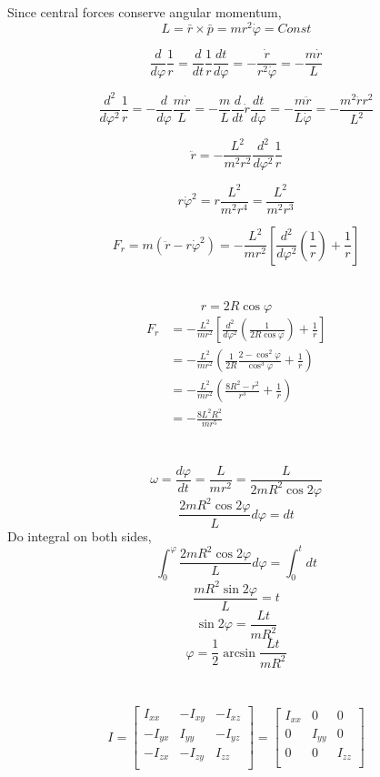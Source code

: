 \documentclass{article}
\begin{document}
\section{}
Since central forces conserve angular momentum,
$$L=\bar{r}\times\bar{p}=mr^2\dot{\varphi}=Const$$

$$\frac{d}{d\varphi}\frac{1}{r}=\frac{d}{dt}\frac{1}{r}\frac{dt}{d\varphi}=-\frac{\dot{r}}{r^2\dot{\varphi}}=-\frac{m\dot{r}}{L}$$

$$\frac{d^2}{d\varphi^2}\frac{1}{r}=-\frac{d}{d\varphi}\frac{m\dot{r}}{L}=-\frac{m}{L}\frac{d}{dt}\dot{r}\frac{dt}{d\varphi}=-\frac{m\ddot{r}}{L\dot{\varphi}}=-\frac{m^2\ddot{r}r^2}{L^2}$$

$$\ddot{r}=-\frac{L^2}{m^2r^2}\frac{d^2}{d\varphi^2}\frac{1}{r}$$

$$r\dot{\varphi}^2=r\frac{L^2}{m^2r^4}=\frac{L^2}{m^2r^3}$$

$$F_r=m(\ddot{r}-r\dot{\varphi}^2)
=-\frac{L^2}{mr^2}\left[\frac{d^2}{d\varphi^2}\left(\frac{1}{r}\right)+\frac{1}{r}\right]$$

\section{}
$$r=2R\cos\varphi$$
\begin{align*}
F_r&=-\frac{L^2}{mr^2}\left[\frac{d^2}{d\varphi^2}\left(\frac{1}{2R\cos\varphi}\right)+\frac{1}{r}\right]\\
&=-\frac{L^2}{mr^2}\left(\frac{1}{2R}\frac{2-\cos^2\varphi}{\cos^3\varphi}+\frac{1}{r}\right)\\
&=-\frac{L^2}{mr^2}\left(\frac{8R^2-r^2}{r^3}+
\frac{1}{r}\right)\\
&=-\frac{8L^2R^2}{mr^5}
\end{align*}


\section{}
$$\omega=\frac{d\varphi}{dt}=\frac{L}{mr^2}=\frac{L}{2mR^2\cos2\varphi}$$
$$\frac{2mR^2\cos2\varphi}{L}d\varphi=dt$$
Do integral on both sides,
$$\int_0^\varphi\frac{2mR^2\cos2\varphi}{L}d\varphi=\int_0^tdt$$
$$\frac{mR^2\sin2\varphi}{L}=t$$
$$\sin2\varphi=\frac{Lt}{mR^2}$$
$$\varphi=\frac{1}{2}\arcsin\frac{Lt}{mR^2}$$
\section{}

\begin{gather*}
I=
\begin{bmatrix}
	 I_{xx} & -I_{xy} & -I_{xz}\\
	-I_{yx} &  I_{yy} & -I_{yz}\\
	-I_{zx} & -I_{zy} &  I_{zz}\\
\end{bmatrix}
=
\begin{bmatrix}
	 I_{xx} & 	  0	  &     0	\\
		0	&  I_{yy} &     0   \\
	    0   & 	  0	  &  I_{zz}	\\
\end{bmatrix}
\end{gather*}
\end{document}
